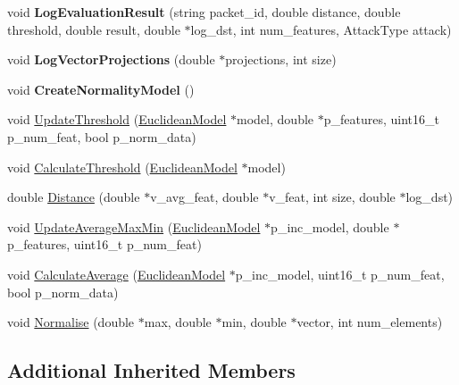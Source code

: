 \begin{DoxyCompactItemize}
\item 
\hypertarget{classDetectorEuclidean_a832df34bd506af4778ad99b51c3dc909}{}void {\bfseries Log\+Evaluation\+Result} (string packet\+\_\+id, double distance, double threshold, double result, double $\ast$log\+\_\+dst, int num\+\_\+features, Attack\+Type attack)\label{classDetectorEuclidean_a832df34bd506af4778ad99b51c3dc909}

\item 
\hypertarget{classDetectorEuclidean_a467a43419abe69be5d98767aef14c208}{}void {\bfseries Log\+Vector\+Projections} (double $\ast$projections, int size)\label{classDetectorEuclidean_a467a43419abe69be5d98767aef14c208}

\item 
\hypertarget{classDetectorEuclidean_ae2cef48b2e6e5ea6b7f201b7c6a6e27a}{}void {\bfseries Create\+Normality\+Model} ()\label{classDetectorEuclidean_ae2cef48b2e6e5ea6b7f201b7c6a6e27a}

\item 
void \hyperlink{classDetectorEuclidean_a09a0f75f67c2f09560428cef82ff4059}{Update\+Threshold} (\hyperlink{classEuclideanModel}{Euclidean\+Model} $\ast$model, double $\ast$p\+\_\+features, uint16\+\_\+t p\+\_\+num\+\_\+feat, bool p\+\_\+norm\+\_\+data)
\item 
void \hyperlink{classDetectorEuclidean_a5c153476961363c67cf34f467aa06062}{Calculate\+Threshold} (\hyperlink{classEuclideanModel}{Euclidean\+Model} $\ast$model)
\item 
double \hyperlink{classDetectorEuclidean_abed09af9d25d97db2c22546c576de054}{Distance} (double $\ast$v\+\_\+avg\+\_\+feat, double $\ast$v\+\_\+feat, int size, double $\ast$log\+\_\+dst)
\item 
void \hyperlink{classDetectorEuclidean_afaebdff052eee6bbdfabd474f2f3b623}{Update\+Average\+Max\+Min} (\hyperlink{classEuclideanModel}{Euclidean\+Model} $\ast$p\+\_\+inc\+\_\+model, double $\ast$p\+\_\+features, uint16\+\_\+t p\+\_\+num\+\_\+feat)
\item 
void \hyperlink{classDetectorEuclidean_a2507d55c396e0912aa8cc54cded8d9e2}{Calculate\+Average} (\hyperlink{classEuclideanModel}{Euclidean\+Model} $\ast$p\+\_\+inc\+\_\+model, uint16\+\_\+t p\+\_\+num\+\_\+feat, bool p\+\_\+norm\+\_\+data)
\item 
void \hyperlink{classDetectorEuclidean_ac6c5aeafe7ea87499b31169fcbf5a0a1}{Normalise} (double $\ast$max, double $\ast$min, double $\ast$vector, int num\+\_\+elements)
\end{DoxyCompactItemize}
\subsection*{Additional Inherited Members}


